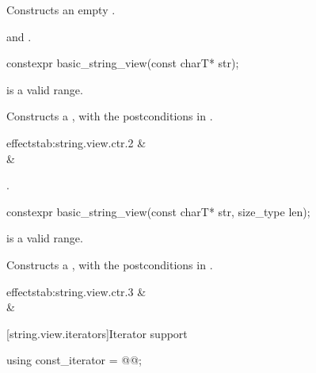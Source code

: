 \begin{itemdescr}
\pnum
\effects
Constructs an empty .

\pnum
\postconditions
{} and .
\end{itemdescr}

%
\begin{itemdecl}
constexpr basic_string_view(const charT* str);
\end{itemdecl}

\begin{itemdescr}
\pnum
\requires
{} is a valid range.

\pnum
\effects
Constructs a , with the postconditions
in .
\begin{libefftabvaluenarrow}{ effects}{tab:string.view.ctr.2}
 &  \\
 &  \\
\end{libefftabvaluenarrow}

\pnum
\complexity
{}.
\end{itemdescr}

%
\begin{itemdecl}
constexpr basic_string_view(const charT* str, size_type len);
\end{itemdecl}

\begin{itemdescr}
\pnum
\requires
{} is a valid range.

\pnum
\effects
Constructs a , with the postconditions in .
\begin{libefftabvaluenarrow}{ effects}{tab:string.view.ctr.3}
 &  \\
 &  \\
\end{libefftabvaluenarrow}
\end{itemdescr}

[string.view.iterators]{Iterator support}

%
\begin{itemdecl}
using const_iterator = @@;
\end{itemdecl}

